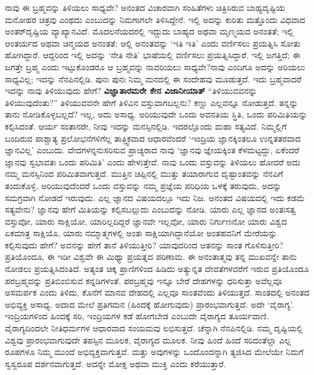 ನಾವು ಈ ಬ್ರಹ್ಮವನ್ನು ತಿಳಿಯಲು ಸಾಧ್ಯವೇ? ಅನಂತದ ವಿಚಾರವಾಗಿ ಸಂಹಿತೆಗಳು ಚಿತ್ರಿಸಿರುವ ಬಾಹ್ಯದೃಷ್ಟಿಯ ಮನೋಹರ ಚಿತ್ರವು ಎಂಥದು ಎಂಬುದನ್ನು ನಿಮಗಾಗಲೇ ತಿಳಿಸಿದ್ದೇನೆ. ಇಲ್ಲಿ ಅದನ್ನು ಕುರಿತು ಮತ್ತೊಂದು ವಿಧವಾದ ಅಂತರ್​ದೃಷ್ಟಿಯ ವ್ಯಾಖ್ಯಾನವಿದೆ. ಮೊದಲನೆಯದರಲ್ಲಿ ಇದ್ದುದು ಬಾಹ್ಯದ ಅಥವಾ ಮೃಣ್ಮಯದ ಅನಂತತೆ; ಇಲ್ಲಿ ಆಂತರ್ಯದ ಅಥವಾ ಚಿನ್ಮಯದ ಅನಂತತೆ; ಅಲ್ಲಿ ಅನಂತವನ್ನು ‘ಇತಿ ಇತಿ’ ಎಂದು ವರ್ಣಿಸಲು ಪ್ರಯತ್ನಿಸಿ ಸೋತು ಹೋಗಿದ್ದಾರೆ. ಆದ್ದರಿಂದ ಇಲ್ಲಿ ಅದನ್ನು ‘ನೇತಿ ನೇತಿ’ ಭಾಷೆಯಲ್ಲಿ ವರ್ಣಿಸಲು ಪ್ರಯತ್ನಿಸಿದ್ದಾರೆ. ಇಲ್ಲಿ ಜಗತ್ತಿದೆ; ಈ ಜಗತ್ತೇ ಬ್ರಹ್ಮ ಎಂದು ಇಟ್ಟುಕೊಂಡರೂ ಆ ಬ್ರಹ್ಮವನ್ನು ನಾವರಿಯಲು ಸಾಧ್ಯವೇ?ನಾವು ಎಂದಿಗೂ ಅದನ್ನು ಅರಿಯಲು ಸಾಧ್ಯವಿಲ್ಲ; ಇದನ್ನು ನೆನಪಿನಲ್ಲಿಡಿ. ಪುನಃ ಪುನಃ ನಿಮ್ಮ ಮನದಲ್ಲಿ ಈ ಸಂದೇಹವು ಮೂಡುತ್ತದೆ. ಇದು ಬ್ರಹ್ಮವಾದರೆ ಇದನ್ನು ನಾವು ತಿಳಿಯುವುದು ಹೇಗೆ? \textbf{ವಿಜ್ಞಾತಾರಮರೇ ಕೇನ ವಿಜಾನೀಯಾತ್​} “ತಿಳಿಯುವವನನ್ನು ತಿಳಿಯುವುದೆಂತು?” ತಿಳಿಯುವವನೇ ಹೇಗೆ ತಿಳಿವಿನ ವಸ್ತುವಾಗಬಲ್ಲನು? ಕಣ್ಣು ಎಲ್ಲವನ್ನೂ ನೋಡುತ್ತದೆ. ತನ್ನನ್ನು ತಾನು ನೋಡಿಕೊಳ್ಳಬಲ್ಲದೆ? ಇಲ್ಲ, ಅದು ಅಸಾಧ್ಯ. ಅರಿಯುವುದೇ ಒಂದು ಅವನತಿಯ ಸ್ಥಿತಿ, ಒಂದು ಪರಿಮಿತಿಯನ್ನು ಕಲ್ಪಿಸಿದಂತೆ. ಆರ್ಯ ಸಂತಾನರೇ, ನೀವು ಇದನ್ನು ಮನಸ್ಸಿನಲ್ಲಿಡಿ. ಇದರಲ್ಲೊಂದು ಮಹಾ ಸತ್ಯವಿದೆ. ನಿಮ್ಮಲ್ಲಿಗೆ ಬಂದಿರುವ ಪಾಶ್ಚಾತ್ಯ ಪ್ರಲೋಭನೆಗಳಿಗೆಲ್ಲ ತಾತ್ತ್ವಿಕವಾದ ಆಧಾರವೆಂದರೆ ‘ಇಂದ್ರಿಯ ಜ್ಞಾನಕ್ಕಿಂತಲೂ ಉನ್ನತತರವಾದ ಜ್ಞಾನವಿಲ್ಲ’ ಎಂಬುದು. ವೇದಗಳನ್ನನುಸರಿಸುವ ಪ್ರಾಚ್ಯರಾದ ನಾವು ‘ಜ್ಞಾನವು ಜ್ಞೇಯಕ್ಕಿಂತ ಕೆಳಮಟ್ಟದ್ದು, ಏಕೆಂದರೆ ಜ್ಞಾನವು ಸ್ವಭಾವತಃ ಒಂದು ಪರಿಮಿತಿ’ ಎಂದು ಹೇಳುತ್ತೇವೆ. ನಾವು ಒಂದು ವಸ್ತುವನ್ನು ತಿಳಿಯಲು ಹೋದರೆ ಅದು ನಮ್ಮ ಮನಸ್ಸಿನಿಂದ ಪರಿಮಿತವಾಗುತ್ತದೆ. ಮುತ್ತಿನ ಚಿಪ್ಪಿನಲ್ಲಿ ಮುತ್ತು ತಯಾರಾಗುವ ದೃಷ್ಟಾಂತವನ್ನು ನೆನಪಿಗೆ ತಂದುಕೊಳ್ಳಿ. ಅರಿಯುವುದೆಂದರೆ ಒಂದು ವಸ್ತುವನ್ನು ನಮ್ಮ ಪ್ರಜ್ಞೆಯ ಪರಿಧಿಯ ಒಳಕ್ಕೆ ತರುವುದು, ಅದನ್ನು ಸಮಗ್ರವಾಗಿ ನೋಡದೆ ಇರುವುದು. ಎಲ್ಲ ಜ್ಞಾನದ ವಿಷಯದಲ್ಲೂ ಇದು ನಿಜ. ಅನಂತದ ವಿಷಯದಲ್ಲಿ ಇದು ಕಡಮೆ ಸತ್ಯವೇನು? ಜ್ಞಾನವು ಹೇಗೆ ಮಿತಿಯನ್ನು ಕಲ್ಪಿಸಬಲ್ಲುದು ಎಂಬುದನ್ನು ನೋಡಿ. ಯಾರು ಎಲ್ಲ ಜ್ಞಾನದ ಅಂತಃಸತ್ವ ವಸ್ತುವೋ, ಯಾರು ಸಾಕ್ಷಿಯೋ, ಯಾರಿಲ್ಲದಿದ್ದರೆ ಜ್ಞಾನವೇ ಇಲ್ಲವೋ, ಯಾರು ನಿರ್ಗುಣನೋ ಯಾರು ವಿಶ್ವದ ಏಕಮಾತ್ರ ಸಾಕ್ಷಿಯೊ, ಯಾರು ನಮ್ಮಾತ್ಮಗಳಲ್ಲಿ ಅಂತಃ ಸಾಕ್ಷಿಯಾಗಿದ್ದಾನೆಯೋ ಅಂತಹವನಿಗೆ ಮೇರೆಯನ್ನು ಕಲ್ಪಿಸುವುದು ಹೇಗೆ? ಅವನನ್ನು ಹೇಗೆ ತಾನೆ ತಿಳಿಯುತ್ತೀರಿ? ಯಾವುದರಿಂದ ಆತನನ್ನು ಸಾಂತ ಗೊಳಿಸುತ್ತೀರಿ? ಪ್ರತಿಯೊಂದೂ, ಈ ಇಡೀ ವಿಶ್ವವೇ ಈ ಮಿಥ್ಯಾ ಪ್ರಯತ್ನದ ಪರಿಣಾಮ. ಈ ಅನಂತಾತ್ಮವು ತನ್ನ ಮುಖವನ್ನೇ ತಾನು ನೋಡಲು ಪ್ರಯತ್ನಿಸಿದಂತಿದೆ. ಅತ್ಯಂತ ಚಿಕ್ಕ ಪ್ರಾಣಿಗಳಿಂದ ಹಿಡಿದು ಅತ್ಯುನ್ನತ ದೇವತೆಗಳವರೆಗೆ ಇರುವ ಪ್ರತಿಯೊಂದೂ ಪರಬ್ರಹ್ಮವನ್ನು ಪ್ರತಿಬಿಂಬಿಸುವ ಕನ್ನಡಿಗಳಂತೆ. ಪರಬ್ರಹ್ಮವು ಇನ್ನೂ ಬೇರೆ ದೇಹಗಳನ್ನು ಧರಿಸುತ್ತಾ ಅವೆಲ್ಲವೂ ಅಸಮರ್ಪಕ ಎಂದು ತಿಳಿದು, ಕೊನೆಗೆ ಮಾನವ ದೇಹದಲ್ಲಿ ಎಲ್ಲವೂ ಸಾಂತವೆಂದು ತಿಳಿಯುತ್ತದೆ. ಸಾಂತದಲ್ಲಿ ಅನಂತದ ಅಭಿವ್ಯಕ್ತಿ ಅಸಾಧ್ಯ. ಅದಾದ ಮೇಲೆ ಪ್ರತಿಗಮನ (ಹಿಂದಕ್ಕೆ ಹೋಗುವುದು) ಪ್ರಾರಂಭವಾಗುತ್ತದೆ. ಅದೇ ‘ವೈರಾಗ್ಯ’. ಇಂದ್ರಿಯಗಳಿಂದ ಹಿಂದಕ್ಕೆ ಸರಿ, ಇಂದ್ರಿಯಗಳ ಕಡೆ ಹೋಗಬೇಡ ಎಂಬುದೇ ವೈರಾಗ್ಯದ ತೂರ್ಯವಾಣಿ. ವೈರಾಗ್ಯದಿಂದಲೇ ನೀತಿಧರ್ಮಗಳ ಆಧಾರವಾದ ಸಂಯಮವು ಲಭಿಸುತ್ತದೆ. ಚೆನ್ನಾಗಿ ನೆನಪಿನಲ್ಲಿಡಿ. ನಮ್ಮ ದೃಷ್ಟಿಯಲ್ಲಿ ವಿಶ್ವವು ಪ್ರಾರಂಭವಾಗುವುದೇ ತಪಸ್ಸಿನ ಮೂಲಕ, ವೈರಾಗ್ಯದ ಮೂಲಕ. ನೀವು ಹಿಂದೆ ಹಿಂದೆ ಸರಿದಂತೆಲ್ಲಾ ಎಲ್ಲ ರೂಪಗಳೂ ನಿಮ್ಮ ಮುಂದೆ ಅಭಿವ್ಯಕ್ತವಾಗುತ್ತವೆ. ಮತ್ತು ಅವುಗಳನ್ನು ಒಂದೊಂದನ್ನಾಗಿ ತ್ಯಜಿಸಿದ ಮೇಲೆಯೇ ನಿಮಗೆ ಸ್ವಸ್ವರೂಪ ದರ್ಶನವಾಗುತ್ತದೆ. ಅದನ್ನೇ ಮೋಕ್ಷ ಅಥವಾ ಮುಕ್ತಿ ಎಂದು ಕರೆಯುತ್ತಾರೆ. 

